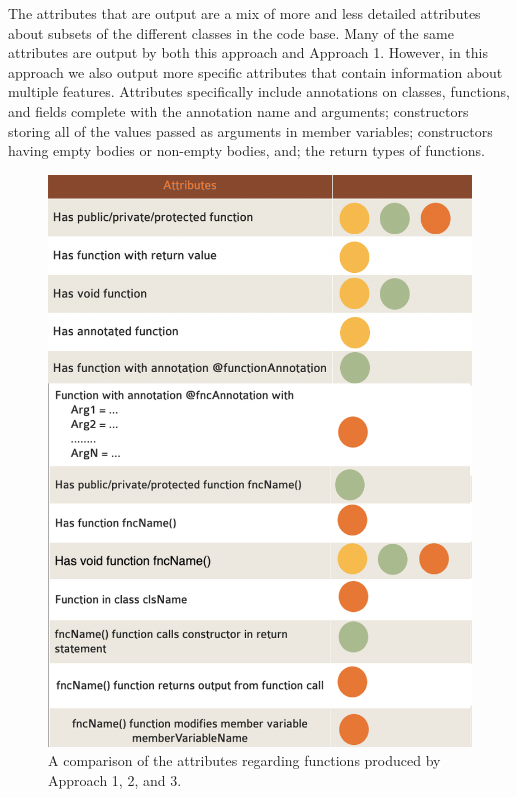 \documentclass[12pt]{article}
\begin{document}
	The attributes that are output are a mix of more and less detailed attributes about subsets of the different classes in the code base. Many of the same attributes are output by both this approach and Approach 1. However, in this approach we also output more specific attributes that contain information about multiple features. Attributes specifically include annotations on classes, functions, and fields complete with the annotation name and arguments; constructors storing all of the values passed as arguments in member variables; constructors having empty bodies or non-empty bodies, and; the return types of functions.
	


\begin{figure}
\centering
\parbox{8 cm}{
\includegraphics[width=\linewidth]{attributeFunctions.png}
\caption{A comparison of the attributes regarding functions produced by Approach 1, 2, and 3.}
\label{fig:attrFunction}}
\qquad
\begin{minipage}{7.5 cm}

\end{minipage}
\end{figure}
\end{document}
